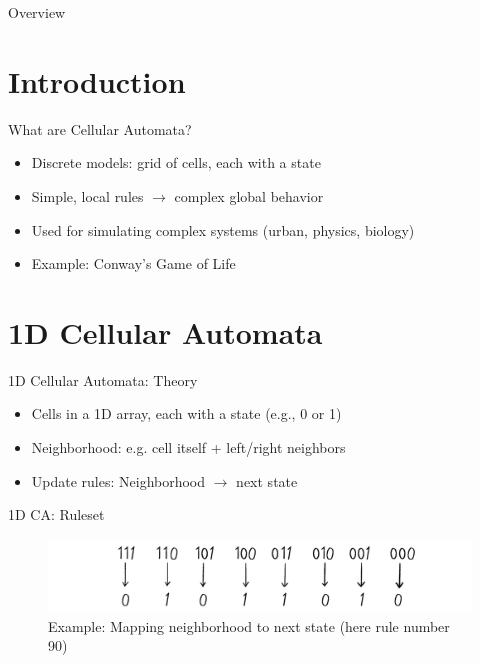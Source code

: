 
\begin{frame}{Overview}
    \tableofcontents
\end{frame}


\section{Introduction}
\begin{frame}{What are Cellular Automata?}
    \begin{itemize}
        \item Discrete models: grid of cells, each with a state
        \item Simple, local rules $\rightarrow$ complex global behavior
        \item Used for simulating complex systems (urban, physics, biology)
        \item Example: Conway's Game of Life
    \end{itemize}
\end{frame}


\section{1D Cellular Automata}
\begin{frame}{1D Cellular Automata: Theory}
    \begin{itemize}
        \item Cells in a 1D array, each with a state (e.g., 0 or 1)
        \item Neighborhood: e.g. cell itself + left/right neighbors
        \item Update rules: Neighborhood $\rightarrow$ next state
    \end{itemize}
\end{frame}

\begin{frame}{1D CA: Ruleset}
    \begin{figure}
        \centering
        \includegraphics[width=\textwidth]{../paper/figures/ruleset_example.png}
        \caption{Example: Mapping neighborhood to next state (here rule number 90)}
    \end{figure}
\end{frame}

